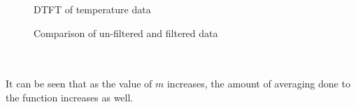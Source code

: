 \documentclass[a4paper,11pt]{article}
\begin{document}
\pagebreak

\begin{figure}[h]
 \begin{center}
  \caption{DTFT of temperature data}
  \vspace{-20pt}
 \end{center}
\end{figure}


\begin{figure}[h]
 \begin{center}
 \vspace{-10pt}
  \caption{Comparison of un-filtered and filtered data}
  \vspace{-30pt}
 \end{center}
\end{figure}
\hfill\\
\hfill\\
It can be seen that as the value of $m$ increases, the amount of averaging done to the function increases as well.
\end{document}
